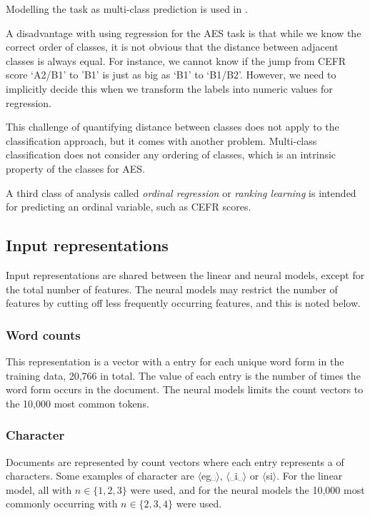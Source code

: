 Modelling the task as multi-class prediction is used in
\textcite{vajjala18universalCEFR}.

A disadvantage with using regression for the AES task is that while we know the
correct order of classes, it is not obvious that the distance between adjacent
classes is always equal. For instance, we cannot know if the jump from CEFR
score `A2/B1' to 'B1' is just as big as `B1' to `B1/B2'. However, we need to
implicitly decide this when we transform the labels into numeric values for
regression.

This challenge of quantifying distance between classes does not apply to the
classification approach, but it comes with another problem. Multi-class
classification does not consider any ordering of classes, which is an
intrinsic property of the classes for AES.

A third class of analysis called \emph{ordinal regression} or \emph{ranking
learning} is intended for predicting an ordinal variable, such as CEFR scores.


\subsection{Input representations}

Input representations are shared between the linear and neural models, except
for the total number of features. The neural models may restrict the number
of features by cutting off less frequently occurring features, and this is
noted below.

\subsubsection*{Word counts}

This representation is a vector with a entry for each unique word form in the
training data, 20,766 in total. The value of each entry is the number of
times the word form occurs in the document. The neural models limits the
count vectors to the 10,000 most common tokens.

\subsubsection*{Character \ngrams}

Documents are represented by count vectors where each entry represents a
\ngram of characters. Some examples of character \ngrams are
$\langle$eg␣$\rangle$, $\langle$␣i␣$\rangle$ or $\langle$si$\rangle$. For the
linear model, all \ngrams with $n\in \{1,2,3\}$ were used, and for the neural
models the 10,000 most commonly occurring \ngrams with $n\in \{2,3,4\}$ were
used.

